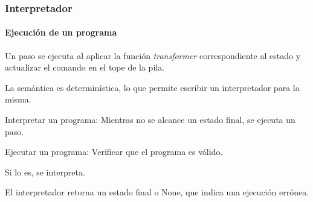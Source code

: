 \begin{frame}
\frametitle{Interpretador}
\framesubtitle{Ejecución de un programa}

Un paso se ejecuta al aplicar la función \textit{transformer} correspondiente al estado y actualizar el comando en el tope de la pila.
\bigskip
\pause

La semántica es determinística, lo que permite escribir un interpretador para la misma.
\bigskip
\pause

\begin{block}{Interpretar un programa:}
Mientras no se alcance un estado final, se ejecuta un paso.
\end{block}

\pause

\begin{block}{Ejecutar un programa:}
Verificar que el programa es válido.

Si lo es, se interpreta.
\end{block}

\bigskip

El interpretador retorna un estado final o None, que indica una ejecución errónea.

\end{frame}

